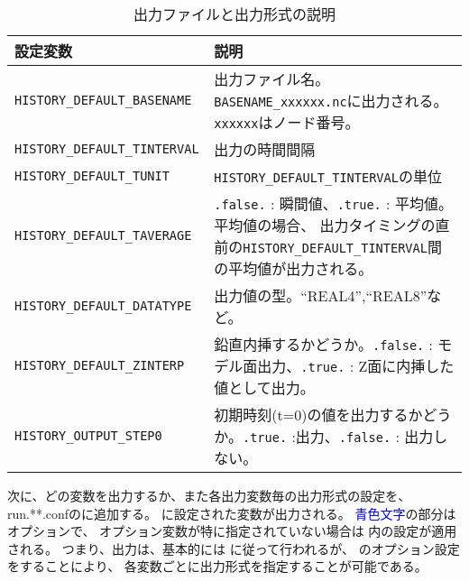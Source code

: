 \begin{table}[htb]
\begin{center}
\caption{出力ファイルと出力形式の説明}
\begin{tabularx}{150mm}{|l|X|} \hline
 \rowcolor[gray]{0.9} 設定変数 & 説明 \\ \hline
 \verb|HISTORY_DEFAULT_BASENAME  | & 出力ファイル名。\verb|BASENAME_xxxxxx.nc|に出力される。\verb|xxxxxx|はノード番号。\\ \hline
 \verb|HISTORY_DEFAULT_TINTERVAL | & 出力の時間間隔 \\ \hline
 \verb|HISTORY_DEFAULT_TUNIT     | & \verb|HISTORY_DEFAULT_TINTERVAL|の単位\\ \hline
 \verb|HISTORY_DEFAULT_TAVERAGE  | & \verb|.false.| : 瞬間値、\verb|.true.| : 平均値。平均値の場合、
 出力タイミングの直前の\verb|HISTORY_DEFAULT_TINTERVAL|間の平均値が出力される。\\ \hline
 \verb|HISTORY_DEFAULT_DATATYPE  | & 出力値の型。``REAL4'',``REAL8''など。\\ \hline
 \verb|HISTORY_DEFAULT_ZINTERP   | & 鉛直内挿するかどうか。\verb|.false.| : モデル面出力、\verb|.true.| : Z面に内挿した値として出力。\\ \hline
 \verb|HISTORY_OUTPUT_STEP0      | & 初期時刻(t=0)の値を出力するかどうか。\verb|.true.| :出力、\verb|.false.| : 出力しない。\\ \hline
\end{tabularx}
\label{tab:history_settings}
\end{center}
\end{table}


次に、どの変数を出力するか、また各出力変数毎の出力形式の設定を、
run.**.confのに追加する。
に設定された変数が出力される。
\textcolor{blue}{青色文字}の部分はオプションで、
オプション変数が特に指定されていない場合は 
内の設定が適用される。
つまり、出力は、基本的には に従って行われるが、
のオプション設定をすることにより、
各変数ごとに出力形式を指定することが可能である。\\


\\


